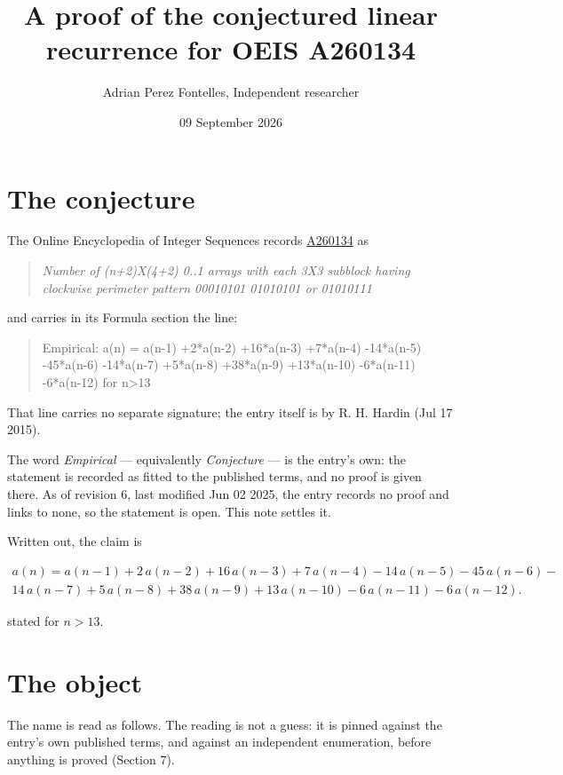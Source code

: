 \documentclass[11pt]{article}
\title{A proof of the conjectured linear recurrence for OEIS A260134}
\author{Adrian Perez Fontelles, Independent researcher}
\date{09 September 2026}
\theoremstyle{definition}
\begin{document}
\maketitle
\section{The conjecture}

The Online Encyclopedia of Integer Sequences records \href{https://oeis.org/A260134}{A260134} as

\begin{quote}\itshape Number of (n+2)X(4+2) 0..1 arrays with each 3X3 subblock having clockwise perimeter pattern 00010101 01010101 or 01010111\end{quote}

and carries in its Formula section the line:

\begin{quote}\ttfamily Empirical: a(n) = a(n-1) +2*a(n-2) +16*a(n-3) +7*a(n-4) -14*a(n-5) -45*a(n-6) -14*a(n-7) +5*a(n-8) +38*a(n-9) +13*a(n-10) -6*a(n-11) -6*a(n-12) for n>13\end{quote}

That line carries no separate signature; the entry itself is by R. H. Hardin (Jul 17 2015).

The word {\itshape Empirical} --- equivalently {\itshape Conjecture} --- is the entry's own: the statement is recorded as fitted to the published terms, and no proof is given there. As of revision 6, last modified Jun 02 2025, the entry records no proof and links to none, so the statement is open. This note settles it.

Written out, the claim is

\begin{multline*} a(n) = a(n-1) + 2\,a(n-2) + 16\,a(n-3) + 7\,a(n-4) - 14\,a(n-5) - 45\,a(n-6) - \\ 14\,a(n-7) + 5\,a(n-8) + 38\,a(n-9) + 13\,a(n-10) - 6\,a(n-11) - 6\,a(n-12). \end{multline*}

stated for $n > 13$.

\section{The object}

The name is read as follows. The reading is not a guess: it is pinned against the entry's own published terms, and against an independent enumeration, before anything is proved (Section 7).
\end{document}
